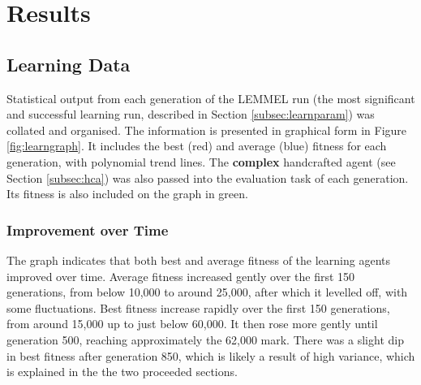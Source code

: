
\section{Results}


\subsection{Learning Data}


Statistical output from each generation of the LEMMEL run (the most significant and successful learning run, described in Section \ref{subsec:learnparam}) was collated and organised. The information is presented in graphical form in Figure \ref{fig:learngraph}. It includes the best (red) and average (blue) fitness for each generation, with polynomial trend lines. The \textbf{complex} handcrafted agent (see Section \ref{subsec:hca}) was also passed into the evaluation task of each generation. Its fitness is also included on the graph in green.

\subsubsection{Improvement over Time}

The graph indicates that both best and average fitness of the learning agents improved over time. Average fitness increased gently over the first 150 generations, from below 10,000 to around 25,000, after which it levelled off, with some fluctuations. Best fitness increase rapidly over the first 150 generations, from around 15,000 up to just below 60,000. It then rose more gently until generation 500, reaching approximately the 62,000 mark. There was a slight dip in best fitness after generation 850, which is likely a result of high variance, which is explained in the the two proceeded sections.


